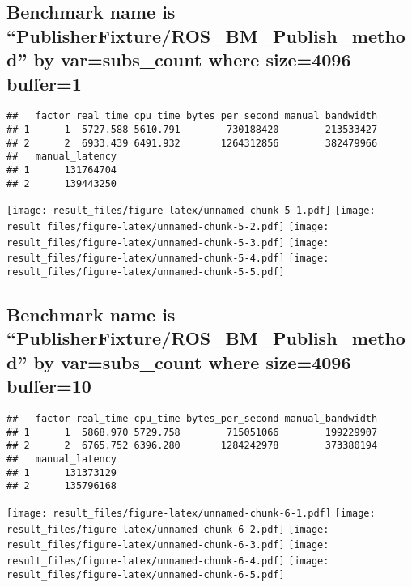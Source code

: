 \documentclass[]{article}
\begin{document}
\hypertarget{benchmark-name-is-publisherfixtureros_bm_publish_method-by-varsubs_count-where-size4096-buffer1}{%
\subsection{Benchmark name is
``PublisherFixture/ROS\_BM\_Publish\_method'' by var=subs\_count where
size=4096
buffer=1}\label{benchmark-name-is-publisherfixtureros_bm_publish_method-by-varsubs_count-where-size4096-buffer1}}

\begin{verbatim}
##   factor real_time cpu_time bytes_per_second manual_bandwidth
## 1      1  5727.588 5610.791        730188420        213533427
## 2      2  6933.439 6491.932       1264312856        382479966
##   manual_latency
## 1      131764704
## 2      139443250
\end{verbatim}

\texttt{[image: result\_files/figure-latex/unnamed-chunk-5-1.pdf]}
\texttt{[image: result\_files/figure-latex/unnamed-chunk-5-2.pdf]}
\texttt{[image: result\_files/figure-latex/unnamed-chunk-5-3.pdf]}
\texttt{[image: result\_files/figure-latex/unnamed-chunk-5-4.pdf]}
\texttt{[image: result\_files/figure-latex/unnamed-chunk-5-5.pdf]}

\hypertarget{benchmark-name-is-publisherfixtureros_bm_publish_method-by-varsubs_count-where-size4096-buffer10}{%
\subsection{Benchmark name is
``PublisherFixture/ROS\_BM\_Publish\_method'' by var=subs\_count where
size=4096
buffer=10}\label{benchmark-name-is-publisherfixtureros_bm_publish_method-by-varsubs_count-where-size4096-buffer10}}

\begin{verbatim}
##   factor real_time cpu_time bytes_per_second manual_bandwidth
## 1      1  5868.970 5729.758        715051066        199229907
## 2      2  6765.752 6396.280       1284242978        373380194
##   manual_latency
## 1      131373129
## 2      135796168
\end{verbatim}

\texttt{[image: result\_files/figure-latex/unnamed-chunk-6-1.pdf]}
\texttt{[image: result\_files/figure-latex/unnamed-chunk-6-2.pdf]}
\texttt{[image: result\_files/figure-latex/unnamed-chunk-6-3.pdf]}
\texttt{[image: result\_files/figure-latex/unnamed-chunk-6-4.pdf]}
\texttt{[image: result\_files/figure-latex/unnamed-chunk-6-5.pdf]}
\end{document}
